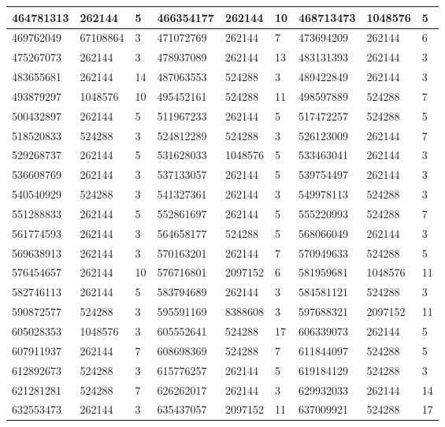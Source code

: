 \documentclass{article}
\begin{document}
\begin{longtable}{|l|l|l||l|l|l||l|l|l|}
\hline
464781313 & 262144 & 5 & 466354177 & 262144 & 10 & 468713473 & 1048576 & 5 \\
\hline
469762049 & 67108864 & 3 & 471072769 & 262144 & 7 & 473694209 & 262144 & 6 \\
\hline
475267073 & 262144 & 3 & 478937089 & 262144 & 13 & 483131393 & 262144 & 3 \\
\hline
483655681 & 262144 & 14 & 487063553 & 524288 & 3 & 489422849 & 262144 & 3 \\
\hline
493879297 & 1048576 & 10 & 495452161 & 524288 & 11 & 498597889 & 524288 & 7 \\
\hline
500432897 & 262144 & 5 & 511967233 & 262144 & 5 & 517472257 & 524288 & 5 \\
\hline
518520833 & 524288 & 3 & 524812289 & 524288 & 3 & 526123009 & 262144 & 7 \\
\hline
529268737 & 262144 & 5 & 531628033 & 1048576 & 5 & 533463041 & 262144 & 3 \\
\hline
536608769 & 262144 & 3 & 537133057 & 262144 & 5 & 539754497 & 262144 & 3 \\
\hline
540540929 & 524288 & 3 & 541327361 & 262144 & 3 & 549978113 & 524288 & 3 \\
\hline
551288833 & 262144 & 5 & 552861697 & 262144 & 5 & 555220993 & 524288 & 7 \\
\hline
561774593 & 262144 & 3 & 564658177 & 524288 & 5 & 568066049 & 262144 & 3 \\
\hline
569638913 & 262144 & 3 & 570163201 & 262144 & 7 & 570949633 & 524288 & 5 \\
\hline
576454657 & 262144 & 10 & 576716801 & 2097152 & 6 & 581959681 & 1048576 & 11 \\
\hline
582746113 & 262144 & 5 & 583794689 & 262144 & 3 & 584581121 & 524288 & 3 \\
\hline
590872577 & 524288 & 3 & 595591169 & 8388608 & 3 & 597688321 & 2097152 & 11 \\
\hline
605028353 & 1048576 & 3 & 605552641 & 524288 & 17 & 606339073 & 262144 & 5 \\
\hline
607911937 & 262144 & 7 & 608698369 & 524288 & 7 & 611844097 & 524288 & 5 \\
\hline
612892673 & 524288 & 3 & 615776257 & 262144 & 5 & 619184129 & 524288 & 3 \\
\hline
621281281 & 524288 & 7 & 626262017 & 262144 & 3 & 629932033 & 262144 & 14 \\
\hline
632553473 & 262144 & 3 & 635437057 & 2097152 & 11 & 637009921 & 524288 & 17 \\

\end{longtable}
\end{document}
